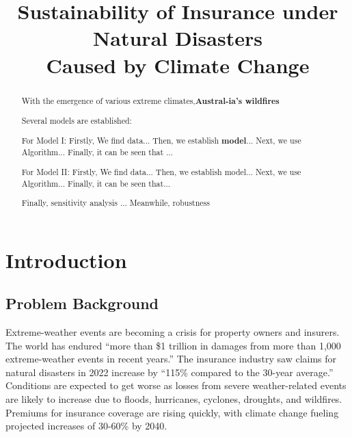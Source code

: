 \documentclass[12pt]{ctexart}
\title{Sustainability of Insurance under Natural Disasters \\ Caused by Climate Change}  %
\begin{document}
\begin{abstract}
	With the emergence of various extreme climates,\textbf{Austral-ia's wildfires} 

	Several models are established: 

	For Model I:
	Firstly,%
	We find data...
	Then,%
	we establish \textbf{model}...
	Next,%
	we use Algorithm...
	Finally,%
	it can be seen that ...

	For Model II:
	Firstly,%
	We find data...
	Then,%
	we establish model...
	Next,%
	we use Algorithm...
	Finally,%
	it can be seen that...

	Finally, sensitivity analysis ... Meanwhile, robustness


\end{abstract}

\maketitle  %

\tableofcontents  %




\section{Introduction}
\subsection{Problem Background}%
Extreme-weather events are becoming a crisis for property owners and insurers. 
The world has endured “more than \$1 trillion in damages from more than 1,000 extreme-weather events in recent years.”
The insurance industry saw claims for natural disasters in 2022 increase by “115\% compared to the 30-year average.” 
Conditions are expected to get worse as losses from severe weather-related events are likely to increase 
due to floods, hurricanes, cyclones, droughts, and wildfires. 
Premiums for insurance coverage are rising quickly, 
with climate change fueling projected increases of 30-60\% by 2040.
\end{document}
